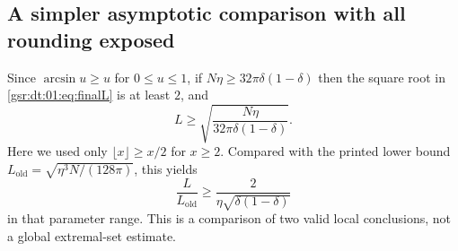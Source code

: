 \documentclass[11pt,letterpaper]{article}
\numberwithin{equation}{section}
\theoremstyle{definition}
\theoremstyle{remark}
\newcommand{\1}{\mathbf 1}
\begin{document}
\subsection{A simpler asymptotic comparison with all rounding exposed}
Since $\arcsin u\ge u$ for $0\le u\le1$, if
$N\eta\ge32\pi\delta(1-\delta)$ then the square root in
\eqref{gsr:dt:01:eq:finalL} is at least $2$, and
\begin{equation}\label{gsr:dt:01:eq:roughL}
 L\ge\sqrt{\frac{N\eta}{32\pi\delta(1-\delta)}}.
\end{equation}
Here we used only $\lfloor x\rfloor\ge x/2$ for $x\ge2$.
Compared with the printed lower bound
$L_{\mathrm{old}}=\sqrt{\eta^3N/(128\pi)}$, this yields
\begin{equation}\label{gsr:dt:01:eq:ratio}
 \frac{L}{L_{\mathrm{old}}}\ge
       \frac{2}{\eta\sqrt{\delta(1-\delta)}}
\end{equation}
in that parameter range. This is a comparison of two valid local
conclusions, not a global extremal-set estimate.
\end{document}

